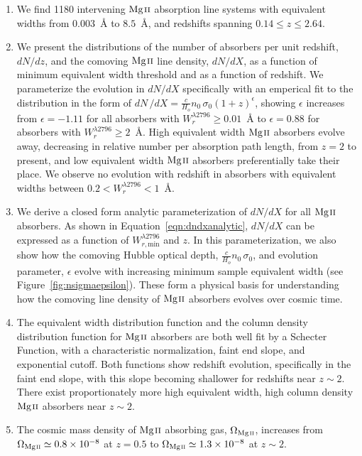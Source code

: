 \documentclass[iop,apj,numberedappendix,appendixfloats,twocolappendix]{emulateapj}
\begin{document}
\begin{enumerate}
\item We find 1180 intervening ${\hbox{{\rm Mg}\kern 0.1em{\sc ii}}}$ absorption line systems with equivalent widths from $0.003$~{\AA} to $8.5$~{\AA}, and redshifts spanning $0.14 \le z \le 2.64$. 
\item We present the distributions of the number of absorbers per unit redshift, $dN\!/dz$, and the comoving ${\hbox{{\rm Mg}\kern 0.1em{\sc ii}}}$ line density, $dN\!/dX$, as a function of minimum equivalent width threshold and as a function of redshift. We parameterize the evolution in $dN\!/dX$ specifically with an emperical fit to the distribution in the form of $dN\,/dX = \frac{c}{H_o}n_0\,\sigma_0(1 + z)^{\epsilon}$, showing $\epsilon$ increases from $\epsilon=-1.11$ for all absorbers with $W_r^{\lambda2796} \ge 0.01$~{\AA} to $\epsilon=0.88$ for absorbers with $W_r^{\lambda2796} \ge 2$~{\AA}. High equivalent width ${\hbox{{\rm Mg}\kern 0.1em{\sc ii}}}$ absorbers evolve away, decreasing in relative number per absorption path length, from $z = 2$ to present, and low equivalent width ${\hbox{{\rm Mg}\kern 0.1em{\sc ii}}}$ absorbers preferentially take their place. We observe no evolution with redshift in absorbers with equivalent widths between $0.2 < W_r^{\lambda2796} < 1$~{\AA}.
\item We derive a closed form analytic parameterization of $dN\!/dX$ for all ${\hbox{{\rm Mg}\kern 0.1em{\sc ii}}}$ absorbers. As shown in Equation~\ref{eqn:dndxanalytic}, $dN\!/dX$ can be expressed as a function of $W_{r,\mathrm{min}}^{\lambda2796}$ and $z$. In this parameterization, we also show how the comoving Hubble optical depth, $\frac{c}{H_o}n_0\,\sigma_0$, and evolution parameter, $\epsilon$ evolve with increasing minimum sample equivalent width (see Figure~\ref{fig:nsigmaepsilon}). These form a physical basis for understanding how the comoving line density of ${\hbox{{\rm Mg}\kern 0.1em{\sc ii}}}$ absorbers evolves over cosmic time. 
\item The equivalent width distribution function and the column density distribution function for ${\hbox{{\rm Mg}\kern 0.1em{\sc ii}}}$ absorbers are both well fit by a Schecter Function, with a characteristic normalization, faint end slope, and exponential cutoff. Both functions show redshift evolution, specifically in the faint end slope, with this slope becoming shallower for redshifts near $z \sim 2$. There exist proportionately more high equivalent width, high column density ${\hbox{{\rm Mg}\kern 0.1em{\sc ii}}}$ absorbers near $z \sim 2$.
\item The cosmic mass density of ${\hbox{{\rm Mg}\kern 0.1em{\sc ii}}}$ absorbing gas, $\Omega_{\hbox{\scriptsize {\MgII}}}$, increases from $\Omega_{\hbox{\scriptsize {\MgII}}} \simeq 0.8\times10^{-8}$ at $z = 0.5$ to $\Omega_{\hbox{\scriptsize {\MgII}}} \simeq 1.3\times10^{-8}$ at $z \sim 2$.

\end{enumerate}
\end{document}
